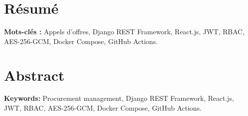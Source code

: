 \chapter*{Résumé}


\lipsum[1]

\bigskip
\noindent\textbf{Mots-clés :} Appels d'offres, Django REST Framework, React.js,
JWT, RBAC, AES-256-GCM, Docker Compose, GitHub Actions.

\newpage

\chapter*{Abstract}


\lipsum[1]

\bigskip
\noindent\textbf{Keywords:} Procurement management, Django REST Framework, React.js,
JWT, RBAC, AES-256-GCM, Docker Compose, GitHub Actions.

\newpage

